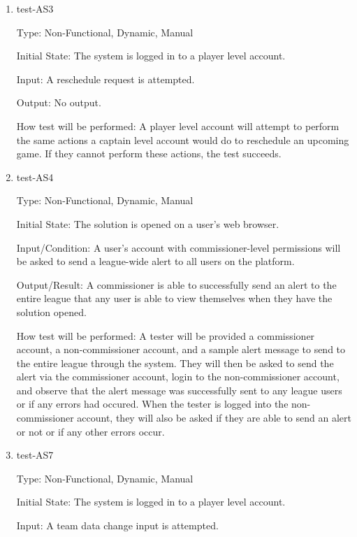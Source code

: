\documentclass[12pt, titlepage]{article}
\begin{document}
\begin{enumerate}

  \item{test-AS3\\}

  Type: Non-Functional, Dynamic, Manual

  Initial State: The system is logged in to a player level account.

  Input: A reschedule request is attempted.

  Output: No output.

  How test will be performed: A player level account will attempt to perform
  the same actions a captain level account would do to reschedule an upcoming
  game. If they cannot perform these actions, the test succeeds.

  \item{test-AS4\\}
  
  Type: Non-Functional, Dynamic, Manual
            
  Initial State: The solution is opened on a user's web browser.
            
  Input/Condition: A user's account with commissioner-level permissions will be asked to
  send a league-wide alert to all users on the platform.
            
  Output/Result: A commissioner is able to successfully send an alert to the entire league
  that any user is able to view themselves when they have the solution opened.
            
  How test will be performed: A tester will be provided a commissioner account, a
  non-commissioner account, and a sample alert message to send to the entire league
  through the system. They will then be asked to send the alert via the commissioner
  account, login to the non-commissioner account, and observe that the alert message
  was successfully sent to any league users or if any errors had occured. When the tester
  is logged into the non-commissioner account, they will also be asked if they are
  able to send an alert or not or if any other errors occur.

  \item{test-AS7\\}

  Type: Non-Functional, Dynamic, Manual

  Initial State: The system is logged in to a player level account.

  Input: A team data change input is attempted.


\end{enumerate}
\end{document}

